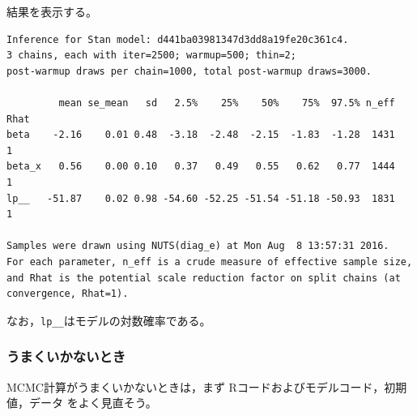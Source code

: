 \documentclass[11pt,uplatex]{jsarticle}
\begin{document}
結果を表示する。
\begin{lstlisting}[basicstyle=\ttfamily\footnotesize]
Inference for Stan model: d441ba03981347d3dd8a19fe20c361c4.
3 chains, each with iter=2500; warmup=500; thin=2; 
post-warmup draws per chain=1000, total post-warmup draws=3000.

         mean se_mean   sd   2.5%    25%    50%    75%  97.5% n_eff Rhat
beta    -2.16    0.01 0.48  -3.18  -2.48  -2.15  -1.83  -1.28  1431    1
beta_x   0.56    0.00 0.10   0.37   0.49   0.55   0.62   0.77  1444    1
lp__   -51.87    0.02 0.98 -54.60 -52.25 -51.54 -51.18 -50.93  1831    1

Samples were drawn using NUTS(diag_e) at Mon Aug  8 13:57:31 2016.
For each parameter, n_eff is a crude measure of effective sample size,
and Rhat is the potential scale reduction factor on split chains (at 
convergence, Rhat=1).
\end{lstlisting}
\noindent
なお，\texttt{lp\_\_}はモデルの対数確率である。

\subsubsection{うまくいかないとき}
MCMC計算がうまくいかないときは，まず \textsf{R}コードおよびモデルコード，初期値，データ
をよく見直そう。
\end{document}
